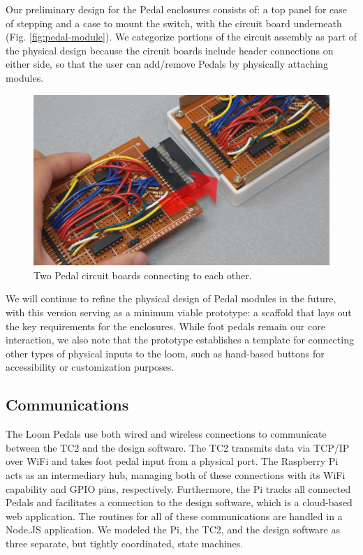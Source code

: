 Our preliminary design for the Pedal enclosures consists of: a top panel for ease of stepping and a case to mount the switch, with the circuit board underneath (Fig. \ref{fig:pedal-module}). We categorize portions of the circuit assembly as part of the physical design because the circuit boards include header connections on either side, so that the user can add/remove Pedals by physically attaching modules. 

\begin{figure}
    \centering
    \includegraphics[width=0.6\linewidth]{figs/LP_8_connecting.jpg}
    \caption{Two Pedal circuit boards connecting to each other.}
    \label{fig:connecting-pedals}
\end{figure}

We will continue to refine the physical design of Pedal modules in the future, with this version serving as a minimum viable prototype: a scaffold that lays out the key requirements for the enclosures. While foot pedals remain our core interaction, we also note that the prototype establishes a template for connecting other types of physical inputs to the loom, such as hand-based buttons for accessibility or customization purposes.

\subsection{Communications}

The Loom Pedals use both wired and wireless connections to communicate between the TC2 and the design software. The TC2 transmits data via TCP/IP over WiFi and takes foot pedal input from a physical port. The Raspberry Pi acts as an intermediary hub, managing both of these connections with its WiFi capability and GPIO pins, respectively. Furthermore, the Pi tracks all connected Pedals and facilitates a connection to the design software, which is a cloud-based web application. The routines for all of these communications are handled in a Node.JS application. We modeled the Pi, the TC2, and the design software as three separate, but tightly coordinated, state machines.

